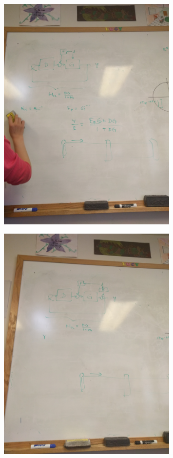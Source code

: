 \documentclass{article}
\begin{document}
\begin{figure}[H]
    \centering
    \includegraphics[width=0.8\textwidth]{pic2.jpg}
\end{figure}

\begin{figure}[H]
    \centering
    \includegraphics[width=0.8\textwidth]{pic3.jpg}
\end{figure}
\end{document}
